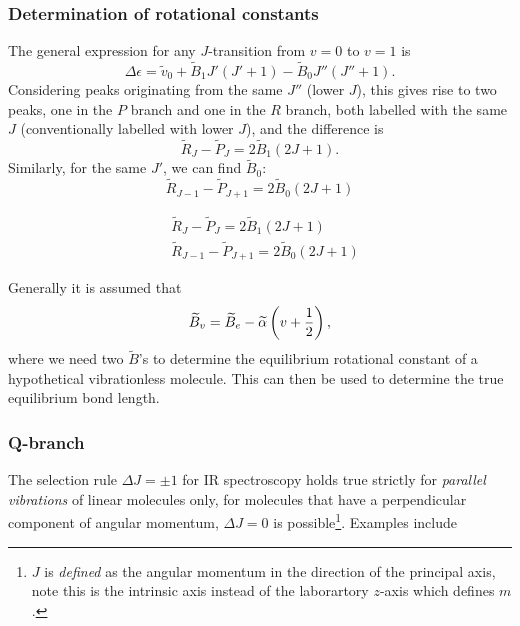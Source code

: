 \subsubsection{Determination of rotational constants}
The general expression for any $J$-transition from $v=0$ to $v=1$ is 
\begin{equation}
\Delta\epsilon=\widetilde{v}_0+\widetilde{B}_1J'(J'+1)-\widetilde{B}_0J''(J''+1).
\end{equation}
Considering peaks originating from the same $J''$ (lower $J$), this gives rise to two peaks, one in the 
$P$ branch and one in the $R$ branch, both labelled with the same $J$ 
(conventionally labelled with lower $J$), and the difference is
\begin{equation}
\widetilde{R}_J-\widetilde{P}_J=2\widetilde{B}_1(2J+1).
\end{equation}
Similarly, for the same $J'$, we can find $\widetilde{B}_0$:
\begin{equation}
\widetilde{R}_{J-1}-\widetilde{P}_{J+1}=2\widetilde{B}_0(2J+1)
\end{equation}
\begin{prt}
\begin{equation}
\begin{aligned}
&\widetilde{R}_J-\widetilde{P}_J=2\widetilde{B}_1(2J+1)\\
&\widetilde{R}_{J-1}-\widetilde{P}_{J+1}=2\widetilde{B}_0(2J+1)
\end{aligned}
\end{equation}
\end{prt}
Generally it is assumed that
\begin{equation}
\widetilde{B}_v=\widetilde{B}_e-\widetilde{\alpha}\left(v+\frac{1}{2} \right),
\end{equation}
where we need two $\widetilde{B}$'s to determine the equilibrium rotational constant of a hypothetical vibrationless molecule. This can then be used to determine the true equilibrium bond length. 
\subsubsection{Q-branch}
The selection rule $\Delta J=\pm1$ for IR spectroscopy holds true strictly for \emph{parallel vibrations} of linear molecules only, for molecules that have a perpendicular component of angular momentum, $\Delta J=0$ is possible\footnote{$J$ is \emph{defined} as the angular momentum in the direction of the principal axis, note this is the intrinsic axis instead of the laborartory $z$-axis which defines $m$.}. Examples include

